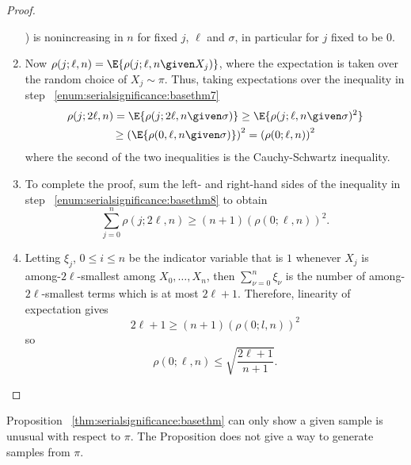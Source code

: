 \documentclass[12pt]{article}
\begin{document}
\begin{proof}
\begin{enumerate}
            \given \sigma) \) is nonincreasing in \( n \) for fixed \( j
            \), \( \ell \) and \( \sigma \), in particular for \( j \)
            fixed to be \( 0 \).
        \item
            \label{enum:serialsignificance:basethm8} Now \( \rho(j;\ell,n)
            = \E{\rho(j; \ell, n \given X_j)} \), where the expectation
            is taken over the random choice of \( X_j \sim \pi \).
            Thus, taking expectations over the inequality in step~%
            \ref{enum:serialsignificance:basethm7}
            \begin{multline}
                \rho(j; 2\ell, n) = \E{\rho(j; 2\ell, n \given \sigma)}
                \ge \E{\rho(j; \ell, n \given \sigma)^2} \\
                \ge \left( \E{\rho(0, \ell, n \given \sigma)}\right)^2 =
                \left( \rho(0; \ell, n) \right)^2
            \end{multline}
            where the second of the two inequalities is the
            Cauchy-Schwartz inequality.
        \item
            To complete the proof, sum the left- and right-hand sides of
            the inequality in step~%
            \ref{enum:serialsignificance:basethm8} to obtain
            \[
                \sum\limits_{j=0}^n \rho(j; 2\ell, n) \ge (n+1) (\rho(0;
                \ell, n))^2.
            \]
        \item
            Letting \( \xi_j \), \( 0 \le i \le n \) be the indicator
            variable that is \( 1 \) whenever \( X_j \) is among-\( 2\ell
            \)-smallest among \( X_0, \dots , X_n \), then \( \sum_{\nu=0}^n
            \xi_{\nu} \) is the number of among-\( 2\ell \)-smallest
            terms which is at most \( 2\ell + 1 \).  Therefore,
            linearity of expectation gives
            \[
                2\ell + 1 \ge (n + 1)(\rho(0; l,n) )^2
            \] so
            \[
                \rho(0; \ell, n) \le \sqrt{ \frac{2\ell + 1}{n+1}}.
            \]
    \end{enumerate}
\end{proof}

\begin{remark}
    Proposition~%
    \ref{thm:serialsignificance:basethm} can only show a given sample is
    unusual with respect to \( \pi \).  The Proposition does not give a
    way to generate samples from \( \pi \).
\end{remark}
\end{document}
